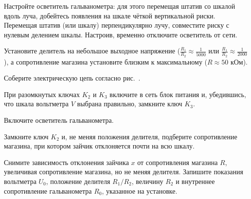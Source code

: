 \begin{lab:task}



	\item Настройте осветитель гальванометра: для этого перемещая штатив со
шкалой вдоль луча, добейтесь появления на шкале чёткой вертикальной
риски. Перемещая штатив (или шкалу) перпендикулярно лучу, совместите
риску с нулевым делением шкалы. Настроив, временно отключите осветитель
от сети.

	\item Установите делитель на небольшое выходное напряжение 
    ($\frac{R_1}{R_2} \approx \frac{1}{5000}$ 
    или $\frac{R_1}{R_2} \approx \frac{1}{2000}$), 
    а сопротивление магазина установите близким к максимальному ($R \approx 50$ кОм).

	\item Соберите электрическую цепь согласно рис.~.

	\item При разомкнутых ключах $K_2$ и
$K_3$ включите в сеть блок питания и, убедившись,
что шкала вольтметра $V$ выбрана правильно, замкните ключ
$K_3$.

	\item Включите осветитель гальванометра.

	\item Замкните ключ $K_2$ и, не меняя положения
делителя, подберите сопротивление магазина, при котором зайчик
отклоняется почти на всю шкалу.


	\item Снимите зависимость отклонения зайчика $x$ от сопротивления
магазина $R$, увеличивая сопротивление магазина, но не меняя
делителя. Запишите показания вольтметра $U_0$,
положение делителя $R_1/R_2$,
величину $R_2$ и внутреннее сопротивление
гальванометра $R_0$, указанное на установке.



\end{lab:task}
